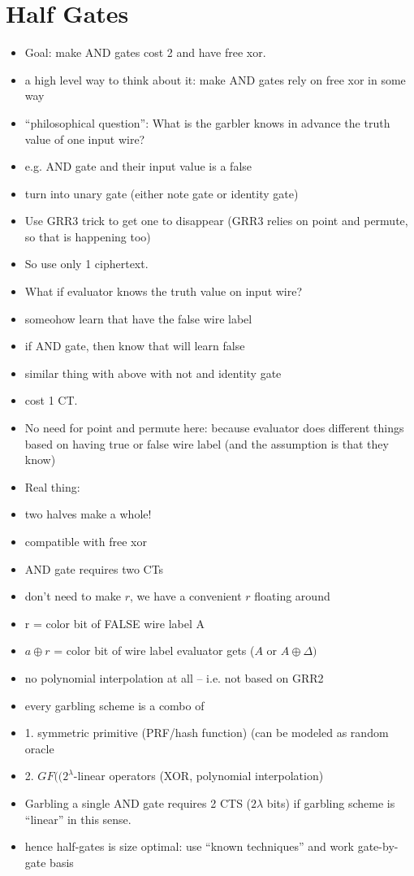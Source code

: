 \documentclass[12pt,twoside]{reedthesis}
\begin{document}
\section{Half Gates}
\begin{itemize}
    \item Goal: make AND gates cost 2 and have free xor.
    \item a high level way to think about it: make AND gates rely on free xor in some way
    \item ``philosophical question'': What is the garbler knows in advance the truth value of one input wire?
    \item e.g. AND gate and their input value is a false
    \item turn into unary gate (either note gate or identity gate)
    \item Use GRR3 trick to get one to disappear (GRR3 relies on point and permute, so that is happening too)
    \item So use only 1 ciphertext.
    \item What if evaluator knows the truth value on input wire?
    \item someohow learn that have the false wire label
    \item if AND gate, then know that will learn false
    \item similar thing with above with not and identity gate
    \item cost 1 CT.
    \item No need for point and permute here: because evaluator does different things based on having true or false wire label (and the assumption is that they know)
    \item Real thing:
    \item two halves make a whole!
    \item compatible with free xor
    \item AND gate requires two CTs
    \item don't need to make $r$, we have a convenient $r$ floating around
    \item r = color bit of FALSE wire label A
    \item $a \oplus r$ = color bit of wire label evaluator gets ($A$ or $A \oplus \Delta)$
    \item no polynomial interpolation at all -- i.e. not based on GRR2
    \item every garbling scheme is a combo of
    \item 1. symmetric primitive (PRF/hash function) (can be modeled as random oracle
    \item 2. $GF((2^{\lambda}$-linear operators (XOR, polynomial interpolation)
    \item Garbling a single AND gate requires 2 CTS ($2 \lambda$ bits) if garbling scheme is ``linear'' in this sense.
    \item hence half-gates is size optimal: use ``known techniques'' and work gate-by-gate basis 
\end{itemize}
\end{document}
